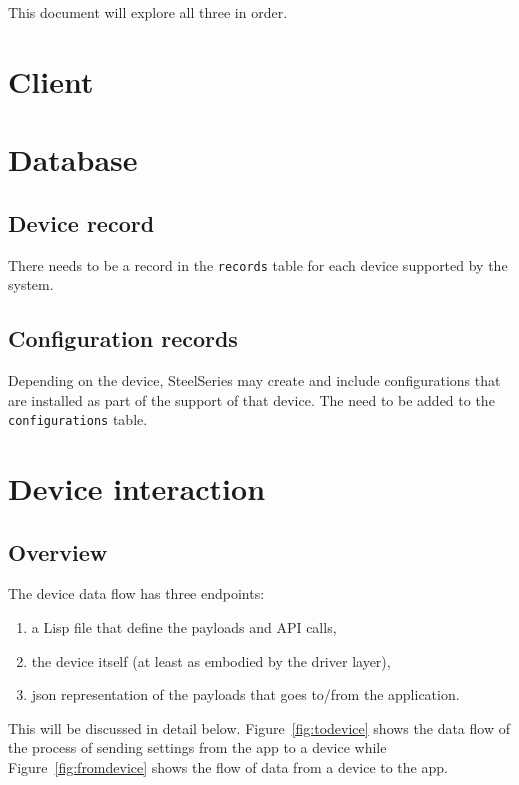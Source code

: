 \documentclass[12pt]{article}
\begin{document}
This document will explore all three in order.


\section{Client}



\section{Database}

\subsection{Device record}

There needs to be a record in the \verb|records| table for each device
supported by the system.

\subsection{Configuration records}

Depending on the device, SteelSeries may create and include
configurations that are installed as part of the support of that
device. The need to be added to the \verb|configurations| table.



\section{Device interaction}

\subsection{Overview}

The device data flow has three endpoints:
\begin{enumerate}
\item a Lisp file that define the payloads and API calls,
\item the device itself (at least as embodied by the driver layer),
\item json representation of the payloads that goes to/from the application.
\end{enumerate}

This will be discussed in detail below. Figure~\ref{fig:todevice}
shows the data flow of the process of sending settings from the app to a device
while Figure~\ref{fig:fromdevice} shows the flow of data from a device
to the app.
\end{document}

